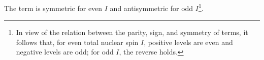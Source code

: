 The term is symmetric for even $I$ and antisymmetric for odd $I$\footnote{In view of the relation between the parity, sign, and symmetry of terms, it follows that, for even total nuclear spin $I$, positive levels are even and negative levels are odd; for odd $I$, the reverse holds.}.
